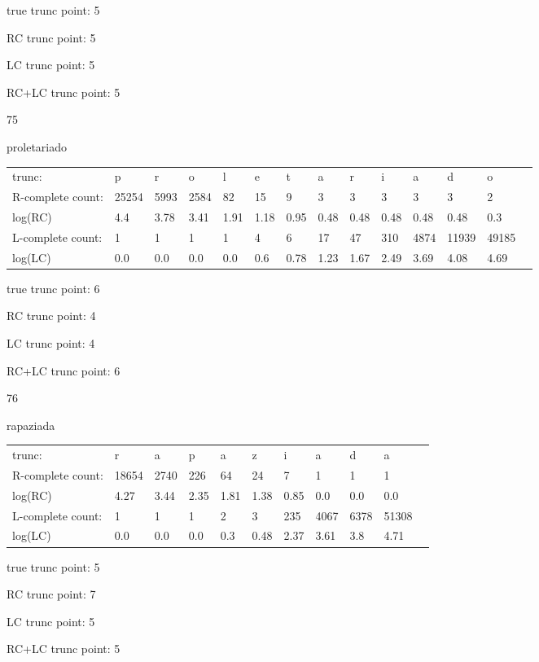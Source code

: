 \documentclass{article}
\begin{document}
true trunc point: 5

RC trunc point: 5

LC trunc point: 5

RC+LC trunc point: 5

\vspace{1em}

75

proletariado

\begin{tabular}{l|lllllllllllll}
trunc: & p & r & o & l & e & t & a & r & i & a & d & o & \\ 
R-complete count: & 25254 & 5993 & 2584 & 82 & 15 & 9 & 3 & 3 & 3 & 3 & 3 & 2 & \\ 
log(RC) & 4.4 & 3.78 & 3.41 & 1.91 & 1.18 & 0.95 & 0.48 & 0.48 & 0.48 & 0.48 & 0.48 & 0.3 & \\ 
L-complete count: & 1 & 1 & 1 & 1 & 4 & 6 & 17 & 47 & 310 & 4874 & 11939 & 49185 & \\ 
log(LC) & 0.0 & 0.0 & 0.0 & 0.0 & 0.6 & 0.78 & 1.23 & 1.67 & 2.49 & 3.69 & 4.08 & 4.69 & \\ 
\end{tabular}

true trunc point: 6

RC trunc point: 4

LC trunc point: 4

RC+LC trunc point: 6

\vspace{1em}

76

rapaziada

\begin{tabular}{l|llllllllll}
trunc: & r & a & p & a & z & i & a & d & a & \\ 
R-complete count: & 18654 & 2740 & 226 & 64 & 24 & 7 & 1 & 1 & 1 & \\ 
log(RC) & 4.27 & 3.44 & 2.35 & 1.81 & 1.38 & 0.85 & 0.0 & 0.0 & 0.0 & \\ 
L-complete count: & 1 & 1 & 1 & 2 & 3 & 235 & 4067 & 6378 & 51308 & \\ 
log(LC) & 0.0 & 0.0 & 0.0 & 0.3 & 0.48 & 2.37 & 3.61 & 3.8 & 4.71 & \\ 
\end{tabular}

true trunc point: 5

RC trunc point: 7

LC trunc point: 5

RC+LC trunc point: 5

\newpage
\end{document}
